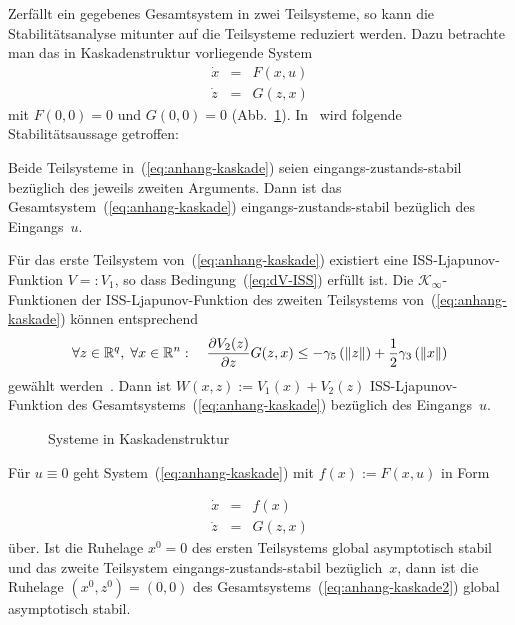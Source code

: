 Zerfällt ein gegebenes Gesamtsystem in zwei Teilsysteme, so kann die
Stabilitätsanalyse mitunter auf die Teilsysteme reduziert werden.
Dazu betrachte man das in Kaskadenstruktur vorliegende System 
\begin{equation}
\begin{array}{lcl}
\dot{x} & = & F(x,u)\\
\dot{z} & = & G(z,x)
\end{array}\label{eq:anhang-kaskade}
\end{equation}
mit $F(0,0)=0$ und $G(0,0)=0$ (Abb.~\ref{fig:Systeme-in-Kaskadenstruktur}).
In~\cite{sontag95iss} wird folgende Stabilitätsaussage getroffen:
\begin{theorem}
\label{thm:ISS-Kaskade}Beide Teilsysteme in~(\ref{eq:anhang-kaskade})
seien eingangs-zustands-stabil bezüglich des jeweils zweiten Arguments.
Dann ist das Gesamtsystem~(\ref{eq:anhang-kaskade}) eingangs-zustands-stabil
bezüglich des Eingangs~$u$. 

\begin{proofsketch}Für das erste Teilsystem von~(\ref{eq:anhang-kaskade})
existiert eine ISS-Ljapunov-Funktion $V=:V_{1}$, so dass Bedingung~(\ref{eq:dV-ISS})
erfüllt ist. Die $\mathcal{K}_{\infty}$-Funktionen der ISS-Ljapunov-Funktion
des zweiten Teilsystems von~(\ref{eq:anhang-kaskade}) können entsprechend
\[
\forall z\in{\mathbb{R}}^{q},\;\forall x\in{\mathbb{R}}^{n}:\quad\frac{\partial V_{2}(z)}{\partial z}G(z,x)\leq-\gamma_{5}\left(\|z\|\right)+\frac{1}{2}\gamma_{3}\left(\|x\|\right)
\]
gewählt werden~\cite{sontag95iss}. Dann ist $W(x,z):=V_{1}(x)+V_{2}(z)$
ISS-Ljapunov-Funktion des Gesamtsystems~(\ref{eq:anhang-kaskade})
bezüglich des Eingangs~$u$.\end{proofsketch}
\end{theorem}
\begin{figure}
\begin{centering}

\par\end{centering}
\caption{Systeme in Kaskadenstruktur\label{fig:Systeme-in-Kaskadenstruktur}}

\end{figure}

Für $u\equiv0$ geht System~(\ref{eq:anhang-kaskade}) mit $f(x):=F(x,u)$
in Form

\begin{equation}
\begin{array}{lcl}
\dot{x} & = & f(x)\\
\dot{z} & = & G(z,x)
\end{array}\label{eq:anhang-kaskade2}
\end{equation}
über. Ist die Ruhelage $x^{0}=0$ des ersten Teilsystems global asymptotisch
stabil und das zweite Teilsystem eingangs-zustands-stabil bezüglich~$x$,
dann ist die Ruhelage $(x^{0},z^{0})=(0,0)$ des Gesamtsystems~(\ref{eq:anhang-kaskade2})
global asymptotisch stabil.


